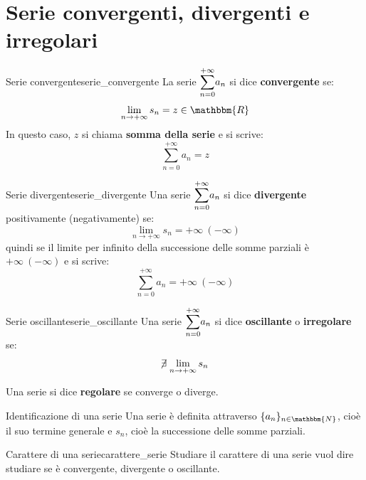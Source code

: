\documentclass[12pt]{report}
\newcounter{definition}
\newcommand{\nmu}{}
\begin{document}
 	\section{Serie convergenti, divergenti e irregolari}
 	\begin{definition}{\nmu Serie convergente}{serie_convergente}
 		La serie $\mathlarger{\sum_{n=0}^{+\infty}}a_n$ si dice \textbf{convergente} se:
 		\[
 		\lim_{n \to +\infty}s_n = z \in \mathbbm{R}
 		\]
 		In questo caso, $z$ si chiama \textbf{somma della serie} e si scrive:
 		\[
 		\sum_{n=0}^{+\infty}a_n = z
 		\]
 	\end{definition}
 	\begin{definition}{\nmu Serie divergente}{serie_divergente}
 		Una serie $\mathlarger{\sum_{n=0}^{+\infty}}a_n$ si dice \textbf{divergente} positivamente (negativamente) se:
 		\[
 		\lim_{n \to +\infty}s_n = +\infty\ (-\infty)
 		\]
 		quindi se il limite per infinito della successione delle somme parziali è $+\infty\ (-\infty)$  e si scrive:
 		\[
 		\sum_{n=0}^{+\infty}a_n = +\infty\ (-\infty)
 		\]
 	\end{definition}
 	\begin{definition}{\nmu Serie oscillante}{serie_oscillante}
 		Una serie $\mathlarger{\sum_{n=0}^{+\infty}}a_n$ si dice \textbf{oscillante} o \textbf{irregolare} se:
 		\[
 		\centernot{\exists}\lim_{n \to +\infty}s_n
 		\]
 	\end{definition}
 	\begin{note}{}{}
 		Una serie si dice \textbf{regolare} se converge o diverge.
 	\end{note}
 	\begin{note}{\nmu Identificazione di una serie}{}
 		Una serie è definita attraverso $\{a_n\}_{n\in\mathbbm{N}}$, cioè il suo termine generale e $s_n$, cioè la successione delle somme parziali.
 	\end{note}
 	\begin{note}{\nmu Carattere di una serie}{carattere_serie}
 		Studiare il carattere di una serie vuol dire studiare se è convergente, divergente o oscillante.
 	\end{note}
\end{document}
